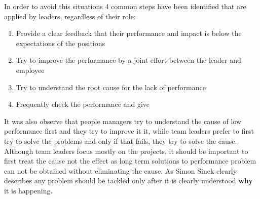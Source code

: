 In order to avoid this situations 4 common steps have been identified that are applied by leaders, regardless of their role:

\begin{enumerate}
\item Provide a clear feedback that their performance and impact is below the expectations of the positions
\item Try to improve the performance by a joint effort between the leader and employee
\item Try to understand the root cause for the lack of performance
\item Frequently check the performance and give 
\end{enumerate}

It was also observe that people managers try to understand the cause of low performance first and they try to improve it it, while team leaders prefer to first try to solve the problems and only if that fails, they try to solve the cause. Although team leaders focus mostly on the projects, it should be important to first treat the cause not the effect as long term solutions to performance problem can not be obtained without eliminating the cause. As Simon Sinek clearly describes \cite{why} any problem should be tackled only after it is clearly understood \textbf{why} it is happening.